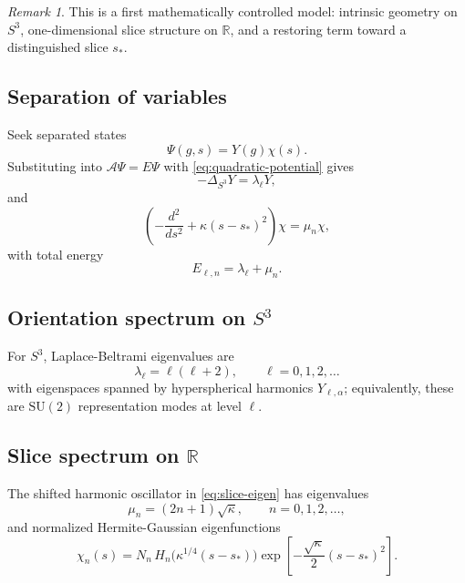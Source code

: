 \documentclass[11pt]{article}
\theoremstyle{remark}
\newtheorem{remark}[definition]{Remark}
\newcommand{\R}{\mathbb{R}}
\newcommand{\SU}{\mathrm{SU}}
\newcommand{\Aop}{\mathcal{A}}
\begin{document}
\begin{remark}
This is a first mathematically controlled model: intrinsic geometry on $S^3$, one-dimensional slice structure on $\R$, and a restoring term toward a distinguished slice $s_*$.
\end{remark}

\subsection{Separation of variables}

Seek separated states
\[
\Psi(g,s)=Y(g)\chi(s).
\]
Substituting into $\Aop\Psi=E\Psi$ with \eqref{eq:quadratic-potential} gives
\begin{equation}
-\Delta_{S^3}Y=\lambda_\ell Y,
\label{eq:orientation-eigen}
\end{equation}
and
\begin{equation}
\left(-\frac{d^2}{ds^2}+\kappa(s-s_*)^2\right)\chi=\mu_n\chi,
\label{eq:slice-eigen}
\end{equation}
with total energy
\[
E_{\ell,n}=\lambda_\ell+\mu_n.
\]

\subsection{Orientation spectrum on \texorpdfstring{$S^3$}{S3}}

For $S^3$, Laplace-Beltrami eigenvalues are \citep{chavel1984,helgason1984}
\begin{equation}
\lambda_\ell=\ell(\ell+2),\qquad \ell=0,1,2,\dots
\label{eq:s3-spectrum}
\end{equation}
with eigenspaces spanned by hyperspherical harmonics $Y_{\ell,\alpha}$; equivalently, these are $\SU(2)$ representation modes at level $\ell$.

\subsection{Slice spectrum on \texorpdfstring{$\R$}{R}}

The shifted harmonic oscillator in \eqref{eq:slice-eigen} has eigenvalues
\begin{equation}
\mu_n=(2n+1)\sqrt{\kappa},\qquad n=0,1,2,\dots,
\label{eq:slice-spectrum}
\end{equation}
and normalized Hermite-Gaussian eigenfunctions \citep{sakurai2017}
\begin{equation}
\chi_n(s)
=
N_n\,H_n\!\big(\kappa^{1/4}(s-s_*)\big)
\exp\!\left[-\frac{\sqrt{\kappa}}{2}(s-s_*)^2\right].
\label{eq:chi}
\end{equation}
\end{document}
